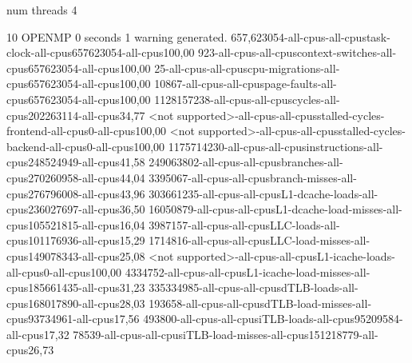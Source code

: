 num threads 4

10
OPENMP
0 seconds
1 warning generated.
657,623054-all-cpus-all-cpustask-clock-all-cpus657623054-all-cpus100,00
923-all-cpus-all-cpuscontext-switches-all-cpus657623054-all-cpus100,00
25-all-cpus-all-cpuscpu-migrations-all-cpus657623054-all-cpus100,00
10867-all-cpus-all-cpuspage-faults-all-cpus657623054-all-cpus100,00
1128157238-all-cpus-all-cpuscycles-all-cpus202263114-all-cpus34,77
<not supported>-all-cpus-all-cpusstalled-cycles-frontend-all-cpus0-all-cpus100,00
<not supported>-all-cpus-all-cpusstalled-cycles-backend-all-cpus0-all-cpus100,00
1175714230-all-cpus-all-cpusinstructions-all-cpus248524949-all-cpus41,58
249063802-all-cpus-all-cpusbranches-all-cpus270260958-all-cpus44,04
3395067-all-cpus-all-cpusbranch-misses-all-cpus276796008-all-cpus43,96
303661235-all-cpus-all-cpusL1-dcache-loads-all-cpus236027697-all-cpus36,50
16050879-all-cpus-all-cpusL1-dcache-load-misses-all-cpus105521815-all-cpus16,04
3987157-all-cpus-all-cpusLLC-loads-all-cpus101176936-all-cpus15,29
1714816-all-cpus-all-cpusLLC-load-misses-all-cpus149078343-all-cpus25,08
<not supported>-all-cpus-all-cpusL1-icache-loads-all-cpus0-all-cpus100,00
4334752-all-cpus-all-cpusL1-icache-load-misses-all-cpus185661435-all-cpus31,23
335334985-all-cpus-all-cpusdTLB-loads-all-cpus168017890-all-cpus28,03
193658-all-cpus-all-cpusdTLB-load-misses-all-cpus93734961-all-cpus17,56
493800-all-cpus-all-cpusiTLB-loads-all-cpus95209584-all-cpus17,32
78539-all-cpus-all-cpusiTLB-load-misses-all-cpus151218779-all-cpus26,73
